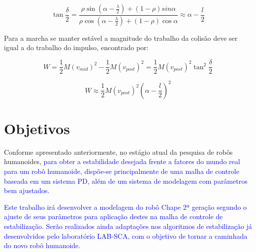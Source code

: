 \begin{equation}
\tan\frac{\delta }{2}=\frac{\rho\sin (\alpha-\frac{\lambda}{2})+(1-\rho)sin\alpha}{\rho\cos (\alpha-\frac{\lambda}{2})+(1-\rho)\cos\alpha }\approx\alpha-\frac{l}{2}
\end{equation}

Para a marcha se manter estável a magnitude do trabalho da colisão deve ser igual a do trabalho do impulso, encontrado por:

\begin{equation}
W=\frac{1}{2}M(v_{mid})^2-\frac{1}{2}M(v_{post})^2=\frac{1}{2}M(v_{post})^2\tan^2\frac{\delta}{2}
\end{equation}


\begin{equation}
W\approx\frac{1}{2}M(v_{post})^2(\alpha-\frac{l}{2})^2
\end{equation}





\newpage

\section{Objetivos}

Conforme apresentado anteriormente, no estágio atual da pesquisa de robôs humanoides, \textcolor{blue}{para obter a estabilidade desejada frente a fatores do mundo real para um robô humanoide, dispõe-se principalmente de uma malha de controle baseada em um sistema PD, além de um sistema de modelagem com parâmetros bem ajustados.}

\textcolor{blue}{Este trabalho irá desenvolver a modelagem do robô Chape 2ª geração segundo o ajuste de seus parâmetros para aplicação destes na malha de controle de estabilização. Serão realizados ainda adaptações nos algoritmos de estabilização já desenvolvidos pelo laboratório LAB-SCA, com o objetivo de tornar a caminhada do novo robô humanoide.} 


